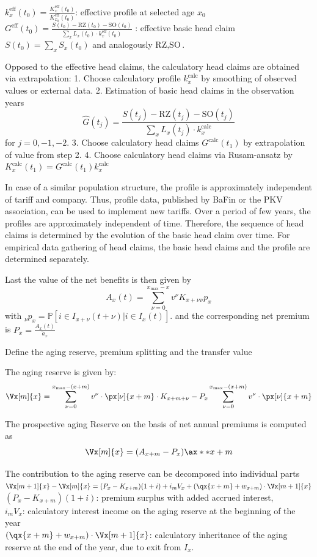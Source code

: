 \documentclass[11pt,a4paper,twoside]{article}
\begin{document}
\( k_x^{\text{eff}}(t_0) = \frac{K_x^{\text{eff}}(t_0)}{K_{x_0}^{\text{eff}}(t_0)} \): effective profile at selected age \(x_0\)
\( G^{\text{eff}}(t_0) = \frac{S(t_0) - \text{RZ}(t_0) - \text{SO}(t_0)}{\sum_{x} L_x(t_0) \cdot k_x^{\text{eff}}(t_0)} \) : effective basic head claim
\( S(t_0) = \sum_{x} S_x(t_0) \) and analogously \( \text{RZ},\text{SO}  \).

Opposed to the effective head claims, the calculatory head claims are obtained via extrapolation:
1. Choose calculatory profile \( k_x^{\text{calc}} \) by smoothing of observed values or external data.
2. Estimation of basic head claims in the observation years
\[
 \hat{G}(t_j) = \frac{S(t_j) - \text{RZ}(t_j) - \text{SO}(t_j)}{\sum_{x} L_x(t_j) \cdot k_x^{\text{calc}}}
\]
for \( j = 0, -1, -2 \).
3. Choose calculatory head claims \( G^{\text{calc}}(t_1) \) by extrapolation of value from step 2.
4. Choose calculatory head claims via Rusam-ansatz by \( K_x^{\text{calc}}(t_1) = G^{\text{calc}}(t_1) k^{\text{calc}}_x \)

In case of a similar population structure, the profile is approximately independent of tariff and
company. Thus, profile data, published by BaFin or the PKV association, can be used to
implement new tariffs.
Over a period of few years, the profiles are approximately independent of time. Therefore, the
sequence of head claims is determined by the evolution of the basic head claim over time.
For empirical data gathering of head claims, the basic head claims and the profile are determined
separately.

Last the value of the net benefits is then given by
\[
  A_x(t) = \sum_{\nu = 0}^{x_{\text{max}} - x} v^\nu K_{x + \nu} {}_{\nu}p_x
\]
with \( _\nu p_x = \mathbb{P}[i \in I_{x + \nu}(t + \nu) | i \in I_x(t)]\).
and the corresponding net premium is \( P_x = \frac{A_x(t)}{\ddot{a}_x} \)



Define the aging reserve, premium splitting and the transfer value

The aging reserve is given by:
\[ 
  \Vx[m]{x} = \sum_{\nu = 0}^{x_{\text{max}} - (x + m)} v^\nu \cdot \px[\nu]{x + m} \cdot K_{x+m+\nu} - P_x \sum_{\nu = 0}^{x_{\text{max}} - (x + m)} v^\nu \cdot \px[\nu]{x+m} 
\]

The prospective aging Reserve on the basis of net annual premiums is computed as
\[ \Vx[m]{x} = (A_{x+m} - P_x)\ax**{x+m} \]

The contribution to the aging reserve can be decomposed into individual parts
\( \Vx[m+1]{x} - \Vx[m]{x} = (P_x - K_{x+m})(1 + i) + i_m V_x + (\qx{x+m} + w_{x+m}) \cdot \Vx[m+1]{x} \) \\
\( (P_x - K_{x+m})(1 + i) \): premium surplus with added accrued interest, \\
\( i_m V_x \): calculatory interest income on the aging reserve at the beginning of the year \\
\( (\qx{x+m} + w_{x+m}) \cdot \Vx[m+1]{x} \): calculatory inheritance of the aging reserve at the end of the year, due to exit from \( I_x \). \\
\end{document}
